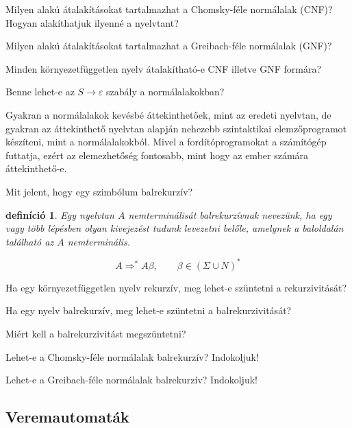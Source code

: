 \documentclass[a4paper]{article}
\newtheorem{definicio}{definíció}[section]
\begin{document}
Milyen alakú átalakításokat tartalmazhat a Chomsky-féle normálalak
(CNF)?
Hogyan alakíthatjuk ilyenné a nyelvtant?

Milyen alakú átalakításokat tartalmazhat a Greibach-féle normálalak
(GNF)?

Minden környezetfüggetlen nyelv átalakítható-e CNF illetve GNF formára?

Benne lehet-e az $S\rightarrow \varepsilon$ szabály a normálalakokban?

Gyakran a normálalakok kevésbé áttekinthetőek, mint az eredeti nyelvtan,
de gyakran az áttekinthető nyelvtan alapján nehezebb szintaktikai
elemzőprogramot készíteni, mint a normálalakokból. Mivel a
fordítóprogramokat a számítógép futtatja, ezért az elemezhetőség
fontosabb, mint hogy az ember számára áttekinthető-e.

Mit jelent, hogy egy szimbólum balrekurzív?

\begin{definicio}
    Egy nyelvtan $A$ \emph{nemterminálisát balrekurzívnak} nevezünk, ha egy vagy
    több lépésben olyan kivejezést tudunk levezetni belőle, amelynek a
    baloldalán található az $A$ nemterminális.

    \[A \Rightarrow^* A \beta,
    \qquad \beta \in (\Sigma \cup N)^*\]
\end{definicio}

Ha egy környezetfüggetlen nyelv rekurzív, meg lehet-e szüntetni a
rekurzivitását?

Ha egy nyelv balrekurzív, meg lehet-e szüntetni a balrekurzivitását?

Miért kell a balrekurzivitást megszüntetni?

Lehet-e a Chomsky-féle normálalak balrekurzív? Indokoljuk!

Lehet-e a Greibach-féle normálalak balrekurzív? Indokoljuk!

\subsection{Veremautomaták}

\end{document}
